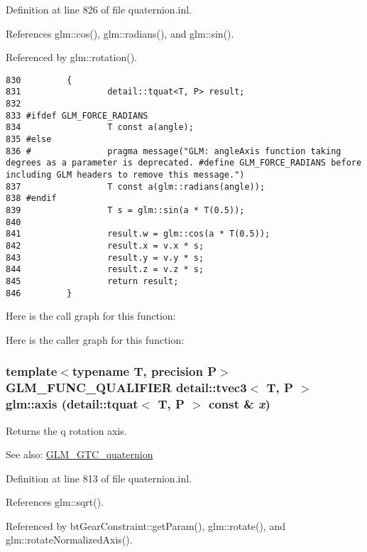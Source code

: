 Definition at line 826 of file quaternion.inl.

References glm::cos(), glm::radians(), and glm::sin().

Referenced by glm::rotation().

\begin{Code}\begin{verbatim}830         {
831                 detail::tquat<T, P> result;
832 
833 #ifdef GLM_FORCE_RADIANS
834                 T const a(angle);
835 #else
836 #               pragma message("GLM: angleAxis function taking degrees as a parameter is deprecated. #define GLM_FORCE_RADIANS before including GLM headers to remove this message.")
837                 T const a(glm::radians(angle));
838 #endif
839                 T s = glm::sin(a * T(0.5));
840 
841                 result.w = glm::cos(a * T(0.5));
842                 result.x = v.x * s;
843                 result.y = v.y * s;
844                 result.z = v.z * s;
845                 return result;
846         }
\end{verbatim}
\end{Code}




Here is the call graph for this function:

Here is the caller graph for this function:\hypertarget{group__gtc__quaternion_g5c243b588291c790bf1b5ec3f0f08d1b}{
\subsubsection[axis]{\setlength{\rightskip}{0pt plus 5cm}template$<$typename T, precision P$>$ GLM\_\-FUNC\_\-QUALIFIER detail::tvec3$<$ T, P $>$ glm::axis (detail::tquat$<$ T, P $>$ const \& {\em x})}}
\label{group__gtc__quaternion_g5c243b588291c790bf1b5ec3f0f08d1b}


Returns the q rotation axis.

\begin{Desc}
\item[See also:]\hyperlink{group__gtc__quaternion}{GLM\_\-GTC\_\-quaternion} \end{Desc}


Definition at line 813 of file quaternion.inl.

References glm::sqrt().

Referenced by btGearConstraint::getParam(), glm::rotate(), and glm::rotateNormalizedAxis().

